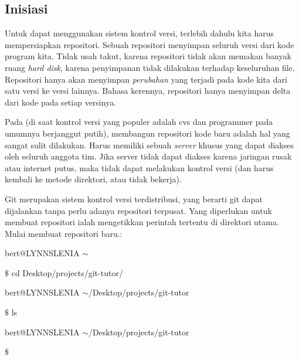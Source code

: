 \subsection{Inisiasi} \par
\hspace*{0.50in} Untuk dapat menggunakan sistem kontrol versi, terlebih dahulu kita harus mempersiapkan repositori. Sebuah repositori menyimpan seluruh versi dari kode program kita. Tidak usah takut, karena repositori tidak akan memakan banyak ruang \emph{hard disk}, karena penyimpanan tidak dilakukan terhadap keseluruhan file. Repositori hanya akan menyimpan \emph{perubahan} yang terjadi pada kode kita dari satu versi ke versi lainnya. Bahasa kerennya, repositori hanya menyimpan delta dari kode pada setiap versinya. \par
\hspace*{0.50in}Pada (di saat kontrol versi yang populer adalah cvs dan programmer pada umumnya berjanggut putih), membangun repositori kode baru adalah hal yang sangat sulit dilakukan. Harus memiliki sebuah \emph{server} khusus yang dapat diakses oleh seluruh anggota tim. Jika server tidak dapat diakses karena jaringan rusak atau internet putus, maka tidak dapat melakukan kontrol versi (dan harus kembali ke metode direktori, atau tidak bekerja). \par
\hspace*{0.50in} Git merupakan sistem kontrol versi terdistribusi, yang berarti git dapat dijalankan tanpa perlu adanya repositori terpusat. Yang diperlukan untuk membuat repositori ialah mengetikkan perintah tertentu di direktori utama. Mulai membuat repositori baru.: \par
\noindent 
{\fontsize{10pt}{10pt}\selectfont bert@LYNNSLENIA  $  \sim  $} \par
\noindent 
{\fontsize{10pt}{10pt}\selectfont  $  \$  $ cd Desktop/projects/git-tutor/} \par
\noindent 
{\fontsize{10pt}{10pt}\selectfont bert@LYNNSLENIA  $  \sim  $/Desktop/projects/git-tutor} \par
\noindent 
{\fontsize{10pt}{10pt}\selectfont  $  \$  $ ls} \par
\noindent 
{\fontsize{10pt}{10pt}\selectfont bert@LYNNSLENIA  $  \sim  $/Desktop/projects/git-tutor} \par
\noindent 
{\fontsize{10pt}{10pt}\selectfont  $  \$  $} \par
\noindent 

